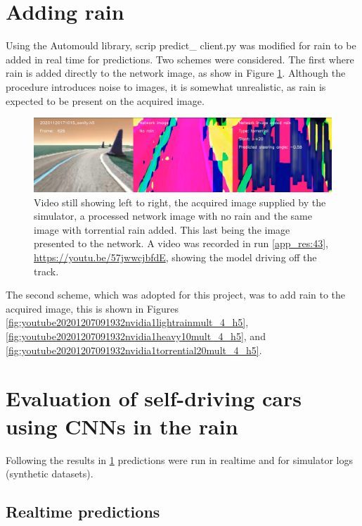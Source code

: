 \section{Adding rain}
\label{res:adding-rain-section}
Using the Automould library, scrip predict\_ client.py was modified for rain to be added in real time for predictions. Two schemes were considered. The first where rain is added directly to the network image, as show in Figure \ref{fig:tcpflow_Run43}. Although the procedure introduces noise to images, it is somewhat unrealistic, as rain is expected to be present on the acquired image.
\begin{figure}[ht]
 \centering 
 \includegraphics[width=\textwidth]{Figures/tcpflow_Run43.png}
 \caption{Video still showing left to right, the acquired image supplied by the simulator, a processed network image with no rain and the same image with torrential rain added. This last being the image presented to the network. A video was recorded in run \ref{app_res:43}, \url{https://youtu.be/57jwwcjbfdE}, showing the model driving off the track.}
 \label{fig:tcpflow_Run43} 
\end{figure}
The second scheme, which was adopted for this project, was to add rain to the acquired image, this is shown in Figures  \ref{fig:youtube20201207091932nvidia1lightrainmult_4_h5},
\ref{fig:youtube20201207091932nvidia1heavy10mult_4_h5}, and
 \ref{fig:youtube20201207091932nvidia1torrential20mult_4_h5}.


\section{Evaluation of self-driving cars using CNNs in the rain}
Following the results in \ref{res:adding-rain-section} predictions were run in realtime and for simulator logs (synthetic datasets).
\subsection{Realtime predictions}

